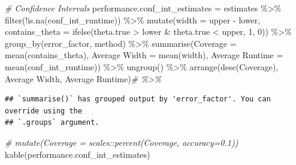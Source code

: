\documentclass[
]{article}
\newenvironment{Shaded}{\begin{snugshade}}{\end{snugshade}}
\newcommand{\AttributeTok}[1]{\textcolor[rgb]{0.77,0.63,0.00}{#1}}
\newcommand{\CommentTok}[1]{\textcolor[rgb]{0.56,0.35,0.01}{\textit{#1}}}
\newcommand{\DecValTok}[1]{\textcolor[rgb]{0.00,0.00,0.81}{#1}}
\newcommand{\FunctionTok}[1]{\textcolor[rgb]{0.00,0.00,0.00}{#1}}
\newcommand{\NormalTok}[1]{#1}
\newcommand{\OtherTok}[1]{\textcolor[rgb]{0.56,0.35,0.01}{#1}}
\newcommand{\SpecialCharTok}[1]{\textcolor[rgb]{0.00,0.00,0.00}{#1}}
\newcommand{\StringTok}[1]{\textcolor[rgb]{0.31,0.60,0.02}{#1}}
\begin{document}
\begin{Shaded}
\begin{Highlighting}[]
\CommentTok{\# Confidence Intervals}
\NormalTok{performance.conf\_int\_estimates }\OtherTok{=}\NormalTok{ estimates }\SpecialCharTok{\%\textgreater{}\%}
  \FunctionTok{filter}\NormalTok{(}\SpecialCharTok{!}\FunctionTok{is.na}\NormalTok{(conf\_int\_runtime)) }\SpecialCharTok{\%\textgreater{}\%}
  \FunctionTok{mutate}\NormalTok{(}\AttributeTok{width =}\NormalTok{ upper }\SpecialCharTok{{-}}\NormalTok{ lower,}
         \AttributeTok{contains\_theta =} \FunctionTok{ifelse}\NormalTok{(theta.true }\SpecialCharTok{\textgreater{}}\NormalTok{ lower }\SpecialCharTok{\&}\NormalTok{ theta.true }\SpecialCharTok{\textless{}}\NormalTok{ upper, }\DecValTok{1}\NormalTok{, }\DecValTok{0}\NormalTok{)) }\SpecialCharTok{\%\textgreater{}\%}
  \FunctionTok{group\_by}\NormalTok{(error\_factor, method) }\SpecialCharTok{\%\textgreater{}\%}
  \FunctionTok{summarise}\NormalTok{(}\AttributeTok{Coverage =} \FunctionTok{mean}\NormalTok{(contains\_theta),}
            \StringTok{\textasciigrave{}}\AttributeTok{Average Width}\StringTok{\textasciigrave{}} \OtherTok{=} \FunctionTok{mean}\NormalTok{(width),}
            \StringTok{\textasciigrave{}}\AttributeTok{Average Runtime}\StringTok{\textasciigrave{}} \OtherTok{=} \FunctionTok{mean}\NormalTok{(conf\_int\_runtime)) }\SpecialCharTok{\%\textgreater{}\%}
  \FunctionTok{ungroup}\NormalTok{() }\SpecialCharTok{\%\textgreater{}\%}
  \FunctionTok{arrange}\NormalTok{(}\FunctionTok{desc}\NormalTok{(Coverage), }\StringTok{\textasciigrave{}}\AttributeTok{Average Width}\StringTok{\textasciigrave{}}\NormalTok{, }\StringTok{\textasciigrave{}}\AttributeTok{Average Runtime}\StringTok{\textasciigrave{}}\NormalTok{)}\CommentTok{\# \%\textgreater{}\%}
\end{Highlighting}
\end{Shaded}

\begin{verbatim}
## `summarise()` has grouped output by 'error_factor'. You can override using the
## `.groups` argument.
\end{verbatim}

\begin{Shaded}
\begin{Highlighting}[]
  \CommentTok{\# mutate(Coverage = scales::percent(Coverage, accuracy=0.1))}
\FunctionTok{kable}\NormalTok{(performance.conf\_int\_estimates)}
\end{Highlighting}
\end{Shaded}
\end{document}
